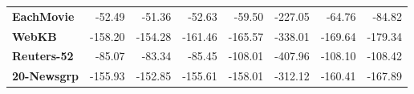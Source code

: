 \documentclass[10pt, t, xcolor={usenames,dvipsnames,svgnames}, compress]{beamer}
\begin{document}
\begin{frame}[t]
\begin{table}
\begin{tabular}{l r r r r r r r}
      \textbf{EachMovie}  & -52.49  & -51.36  & -52.63  & -59.50  & -227.05 & -64.76  & -84.82  \\
      \textbf{WebKB}      & -158.20 & -154.28 & -161.46 & -165.57 & -338.01 & -169.64 & -179.34 \\
      \textbf{Reuters-52} & -85.07  & -83.34  & -85.45  & -108.01 & -407.96 & -108.10 & -108.42 \\
      \textbf{20-Newsgrp} & -155.93 & -152.85 & -155.61 & -158.01 & -312.12 & -160.41 & -167.89 \\
    \end{tabular}
    \label{tab:model-accs}
  \end{table}
\end{frame}
\end{document}
